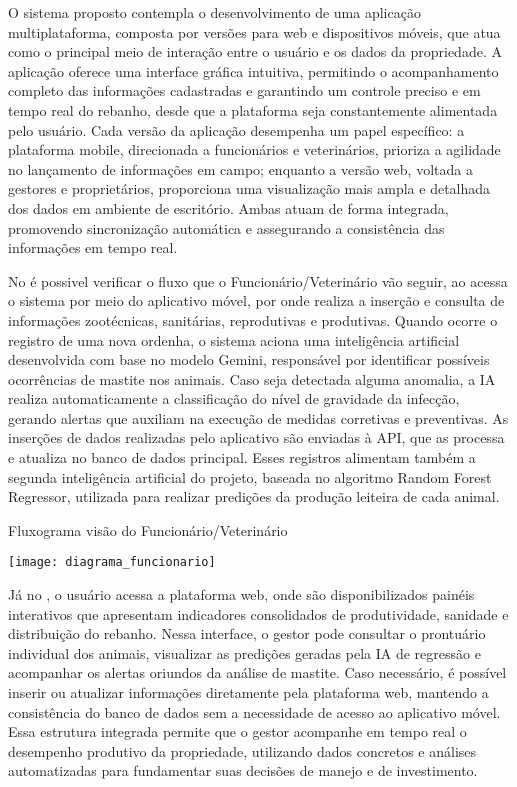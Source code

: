 O sistema proposto contempla o desenvolvimento de uma aplicação multiplataforma, composta por versões para web e dispositivos móveis, que atua como o principal meio de interação entre o usuário e os dados da propriedade. A aplicação oferece uma interface gráfica intuitiva, permitindo o acompanhamento completo das informações cadastradas e garantindo um controle preciso e em tempo real do rebanho, desde que a plataforma seja constantemente alimentada pelo usuário. Cada versão da aplicação desempenha um papel específico: a plataforma mobile, direcionada a funcionários e veterinários, prioriza a agilidade no lançamento de informações em campo; enquanto a versão web, voltada a gestores e proprietários, proporciona uma visualização mais ampla e detalhada dos dados em ambiente de escritório. Ambas atuam de forma integrada, promovendo sincronização automática e assegurando a consistência das informações em tempo real.

No  é possivel verificar o fluxo que o Funcionário/Veterinário vão seguir, ao acessa o sistema por meio do aplicativo móvel, por onde realiza a inserção e consulta de informações zootécnicas, sanitárias, reprodutivas e produtivas. Quando ocorre o registro de uma nova ordenha, o sistema aciona uma inteligência artificial desenvolvida com base no modelo Gemini, responsável por identificar possíveis ocorrências de mastite nos animais. Caso seja detectada alguma anomalia, a IA realiza automaticamente a classificação do nível de gravidade da infecção, gerando alertas que auxiliam na execução de medidas corretivas e preventivas. As inserções de dados realizadas pelo aplicativo são enviadas à API, que as processa e atualiza no banco de dados principal. Esses registros alimentam também a segunda inteligência artificial do projeto, baseada no algoritmo Random Forest Regressor, utilizada para realizar predições da produção leiteira de cada animal.

\begin{flowchart}[!htb]
\centering
\caption{Fluxograma visão do Funcionário/Veterinário}%
\label{fcht:fluxograma1}
\texttt{[image: diagrama\_funcionario]}
\end{flowchart}

\newpage

Já no , o usuário acessa a plataforma web, onde são disponibilizados painéis interativos que apresentam indicadores consolidados de produtividade, sanidade e distribuição do rebanho. Nessa interface, o gestor pode consultar o prontuário individual dos animais, visualizar as predições geradas pela IA de regressão e acompanhar os alertas oriundos da análise de mastite. Caso necessário, é possível inserir ou atualizar informações diretamente pela plataforma web, mantendo a consistência do banco de dados sem a necessidade de acesso ao aplicativo móvel. Essa estrutura integrada permite que o gestor acompanhe em tempo real o desempenho produtivo da propriedade, utilizando dados concretos e análises automatizadas para fundamentar suas decisões de manejo e de investimento.

